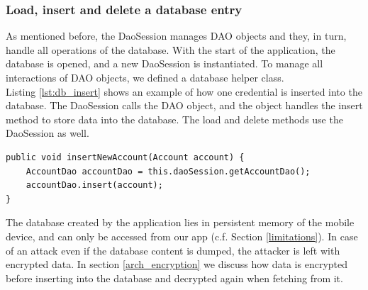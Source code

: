 \subsubsection*{Load, insert and delete a database entry}
As mentioned before, the DaoSession manages DAO objects and they, in turn, handle all operations of the database. With the start of the application, the database is opened, and a new DaoSession is instantiated. To manage all interactions of DAO objects, we defined a database helper class. \\
Listing \ref{lst:db_insert} shows an example of how one credential is inserted into the database. The DaoSession calls the DAO object, and the object handles the insert method to store data into the database. The load and delete methods use the DaoSession as well. 

\begin{lstlisting}[float,floatplacement=h, caption= Insert Entry into Database, label=lst:db_insert]
public void insertNewAccount(Account account) {
    AccountDao accountDao = this.daoSession.getAccountDao();
    accountDao.insert(account);
}
\end{lstlisting}
\vspace{0.5cm}

The database created by the application lies in persistent memory of the mobile device, and can only be accessed from our app (c.f. Section \ref{limitations}). In case of an attack even if the database content is dumped, the attacker is left with encrypted data. In section \ref{arch_encryption} we discuss how data is encrypted before inserting into the database and decrypted again when fetching from it. \\



